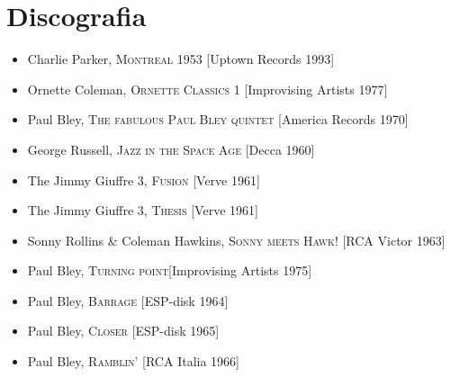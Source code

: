 \chapter*{Discografia}
\begin{itemize}
	\item Charlie Parker, \textsc{Montreal 1953} [Uptown Records 1993]
	\item Ornette Coleman, \textsc{Ornette Classics 1} [Improvising Artists 1977]
	\item Paul Bley, \textsc{The fabulous Paul Bley quintet} [America Records 1970]
	\item George Russell, \textsc{Jazz in the Space Age} [Decca 1960]
	\item The Jimmy Giuffre 3, \textsc{Fusion} [Verve 1961]
	\item The Jimmy Giuffre 3, \textsc{Thesis} [Verve 1961]
	\item Sonny Rollins \& Coleman Hawkins, \textsc{Sonny meets Hawk!} [RCA Victor 1963]
	\item Paul Bley, \textsc{Turning point}[Improvising Artists 1975]
	\item Paul Bley, \textsc{Barrage} [ESP-disk 1964] 
	\item Paul Bley, \textsc{Closer} [ESP-disk 1965] 
	\item Paul Bley, \textsc{Ramblin'} [RCA Italia 1966]
\end{itemize}